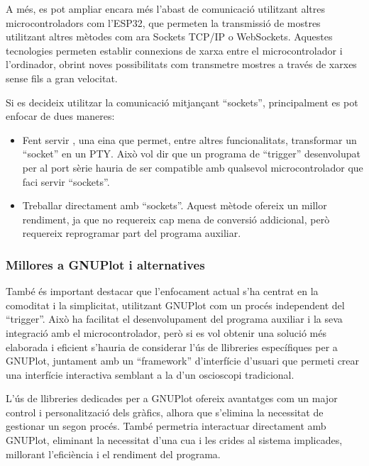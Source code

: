\documentclass{tfgitic}[2023/06/30]
\begin{document}
A més, es pot ampliar encara més l'abast de comunicació utilitzant
altres microcontroladors com l'ESP32, que permeten la transmissió de
mostres utilitzant altres mètodes com ara Sockets TCP/IP o
WebSockets. Aquestes tecnologies permeten establir connexions de xarxa
entre el microcontrolador i l'ordinador, obrint noves possibilitats
com transmetre mostres a través de xarxes sense fils a gran velocitat.

Si es decideix utilitzar la comunicació mitjançant ``sockets'',
principalment es pot enfocar de dues maneres:

\begin{itemize}
	\item Fent servir \cite[socat]{socat}, una eina que permet,
          entre altres funcionalitats, transformar un ``socket'' en un
          PTY. Això vol dir que un programa de ``trigger''
          desenvolupat per al port sèrie hauria de ser compatible amb
          qualsevol microcontrolador que faci servir ``sockets''.
	\item Treballar directament amb ``sockets''. Aquest mètode
          ofereix un millor rendiment, ja que no requereix cap mena de
          conversió addicional, però requereix reprogramar part del
          programa auxiliar.
\end{itemize}

\subsubsection{Millores a GNUPlot i alternatives}

També és important destacar que l'enfocament actual s'ha centrat en la
comoditat i la simplicitat, utilitzant GNUPlot com un procés
independent del ``trigger''. Això ha facilitat el desenvolupament del
programa auxiliar i la seva integració amb el microcontrolador, però
si es vol obtenir una solució més elaborada i eficient s'hauria de
considerar l'ús de llibreries específiques per a GNUPlot, juntament
amb un ``framework'' d'interfície d'usuari que permeti crear una
interfície interactiva semblant a la d'un osci\lgem oscopi
tradicional.

L'ús de llibreries dedicades per a GNUPlot ofereix avantatges com un
major control i personalització dels gràfics, alhora que s'elimina la
necessitat de gestionar un segon procés. També permetria interactuar
directament amb GNUPlot, eliminant la necessitat d'una cua i les
crides al sistema implicades, millorant l'eficiència i el rendiment
del programa.
\end{document}
